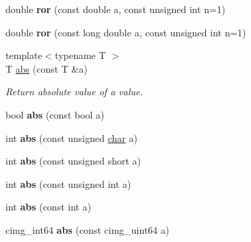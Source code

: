 \begin{DoxyCompactItemize}
double {\bfseries ror} (const double a, const unsigned int n=1)
\item 
\mbox{\label{namespacecimg__library__suffixed_1_1cimg_a28a92e1f3aec1b1ff7a6c4277473144d}} 
double {\bfseries ror} (const long double a, const unsigned int n=1)
\item 
\mbox{\label{namespacecimg__library__suffixed_1_1cimg_a0852e9ad458e82d2c003844cd92bdb8a}} 
{\footnotesize template$<$typename T $>$ }\\T \hyperlink{namespacecimg__library__suffixed_1_1cimg_a0852e9ad458e82d2c003844cd92bdb8a}{abs} (const T \&a)
\begin{DoxyCompactList}\small\item\em Return absolute value of a value. \end{DoxyCompactList}\item 
\mbox{\label{namespacecimg__library__suffixed_1_1cimg_a58594a6c544821be41beb663f65ae6f7}} 
bool {\bfseries abs} (const bool a)
\item 
\mbox{\label{namespacecimg__library__suffixed_1_1cimg_a98875c08cd797ad18f78b3010d998f43}} 
int {\bfseries abs} (const unsigned \hyperlink{classchar}{char} a)
\item 
\mbox{\label{namespacecimg__library__suffixed_1_1cimg_ac065ecac4db3e755a220ba19e423ebb4}} 
int {\bfseries abs} (const unsigned short a)
\item 
\mbox{\label{namespacecimg__library__suffixed_1_1cimg_a442fd2c14c431028a04c10618aa03261}} 
int {\bfseries abs} (const unsigned int a)
\item 
\mbox{\label{namespacecimg__library__suffixed_1_1cimg_a26acb5583d30cb7eeea839ef82a73270}} 
int {\bfseries abs} (const int a)
\item 
\mbox{\label{namespacecimg__library__suffixed_1_1cimg_a806bd69aeff5adab7bb5081132f5c68b}} 
cimg\+\_\+int64 {\bfseries abs} (const cimg\+\_\+uint64 a)

\end{DoxyCompactItemize}
